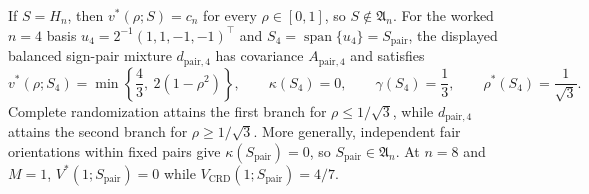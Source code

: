 If \(S=H_n\), then \(v^*(\rho;S)=c_n\) for every \(\rho\in[0,1]\), so \(S\notin\mathfrak A_n\). For the worked \(n=4\) basis \(u_4=2^{-1}(1,1,-1,-1)^\top\) and \(S_4=\operatorname{span}\{u_4\}=S_{\mathrm{pair}}\), the displayed balanced sign-pair mixture \(d_{\mathrm{pair},4}\) has covariance \(A_{\mathrm{pair},4}\) and satisfies \[v^*(\rho;S_4)=\min\left\{\frac43,\ 2(1-\rho^2)\right\},\qquad \kappa(S_4)=0,\qquad \gamma(S_4)=\frac13,\qquad \rho^*(S_4)=\frac1{\sqrt3}.\] Complete randomization attains the first branch for \(\rho\leq1/\sqrt3\), while \(d_{\mathrm{pair},4}\) attains the second branch for \(\rho\geq1/\sqrt3\). More generally, independent fair orientations within fixed pairs give \(\kappa(S_{\mathrm{pair}})=0\), so \(S_{\mathrm{pair}}\in\mathfrak A_n\). At \(n=8\) and \(M=1\), \(V^*(1;S_{\mathrm{pair}})=0\) while \(V_{\mathrm{CRD}}(1;S_{\mathrm{pair}})=4/7\).